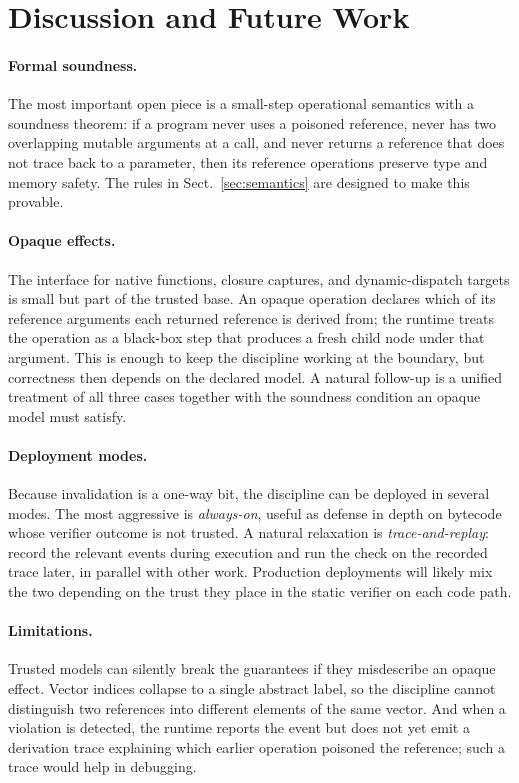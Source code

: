 \section{Discussion and Future Work}\label{sec:discussion}

\paragraph{Formal soundness.}
The most important open piece is a small-step operational semantics
with a soundness theorem: if a program never uses a poisoned
reference, never has two overlapping mutable arguments at a call,
and never returns a reference that does not trace back to a
parameter, then its reference operations preserve type and memory
safety. The rules in Sect.~\ref{sec:semantics} are designed to make
this provable.

\paragraph{Opaque effects.}
The interface for native functions, closure captures, and
dynamic-dispatch targets is small but part of the trusted base. An
opaque operation declares which of its reference arguments each
returned reference is derived from; the runtime treats the operation
as a black-box step that produces a fresh child node under that
argument. This is enough to keep the discipline working at the
boundary, but correctness then depends on the declared model. A
natural follow-up is a unified treatment of all three cases together
with the soundness condition an opaque model must satisfy.

\paragraph{Deployment modes.}
Because invalidation is a one-way bit, the discipline can be deployed
in several modes. The most aggressive is \emph{always-on}, useful as
defense in depth on bytecode whose verifier outcome is not trusted.
A natural relaxation is \emph{trace-and-replay}: record the relevant
events during execution and run the check on the recorded trace
later, in parallel with other work. Production deployments will
likely mix the two depending on the trust they place in the static
verifier on each code path.

\paragraph{Limitations.}
Trusted models can silently break the guarantees if they misdescribe
an opaque effect. Vector indices collapse to a single abstract label,
so the discipline cannot distinguish two references into different
elements of the same vector. And when a violation is detected, the
runtime reports the event but does not yet emit a derivation trace
explaining which earlier operation poisoned the reference; such a
trace would help in debugging.

